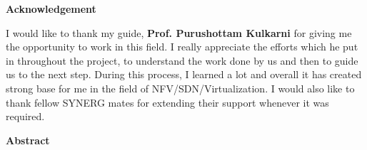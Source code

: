 \documentclass[a4paper,11pt]{report}
\begin{document}
\newpage
\vspace*{3cm}
{\center \textbf {Acknowledgement}\\}

\vspace{0.5cm}
\noindent I would like to thank my guide, \textbf {Prof. Purushottam Kulkarni} for giving me the opportunity to work in this field. I really appreciate the efforts which he put in throughout the project, to understand the work done by us and then to guide us to the next step. During this process, I learned a lot and overall it has created strong base for me in the field of NFV/SDN/Virtualization. I would also like to thank fellow SYNERG mates for extending their support whenever it was required.   
\newpage

\vspace*{2cm}
{\center \textbf {Abstract}\\}
\vspace{1cm}
\noindent    

\end{document}
